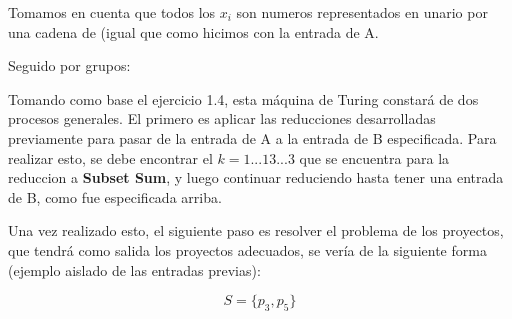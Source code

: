 Tomamos en cuenta que todos los $x_i$ son numeros representados en unario por 
una cadena de  (igual que como hicimos con la entrada de A.

Seguido por grupos:

\begin{center}
\end{center}

Tomando como base el ejercicio 1.4, esta máquina de Turing constará de dos 
procesos generales. El primero es aplicar las reducciones desarrolladas 
previamente para pasar de la entrada de A a la entrada de B especificada. 
Para realizar esto, se debe encontrar el $k = 1...13...3$ que se encuentra 
para la reduccion a \textbf{Subset Sum}, y luego continuar reduciendo hasta 
tener una entrada de B, como fue especificada arriba.

Una vez realizado esto, el siguiente paso es resolver el problema de los
proyectos, que tendrá como salida los proyectos adecuados, se vería de la
siguiente forma (ejemplo aislado de las entradas previas):

\[
  S = \{p_3, p_5\}
\]

